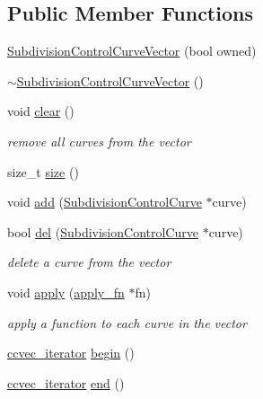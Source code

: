 \subsection*{Public Member Functions}
\begin{DoxyCompactItemize}
\item 
\hyperlink{classShipCAD_1_1SubdivisionControlCurveVector_aed33415ee5279a469d62a4433776df26}{Subdivision\-Control\-Curve\-Vector} (bool owned)
\item 
\hyperlink{classShipCAD_1_1SubdivisionControlCurveVector_adc5d990adac605cc8729f3a9115c91d2}{$\sim$\-Subdivision\-Control\-Curve\-Vector} ()
\item 
void \hyperlink{classShipCAD_1_1SubdivisionControlCurveVector_a5bfece236c23baff743107b90075fe9c}{clear} ()
\begin{DoxyCompactList}\small\item\em remove all curves from the vector \end{DoxyCompactList}\item 
size\-\_\-t \hyperlink{classShipCAD_1_1SubdivisionControlCurveVector_a20adf2059ae6fd4c6a5d08c48093a2bf}{size} ()
\item 
void \hyperlink{classShipCAD_1_1SubdivisionControlCurveVector_a23b7c48a1e02692f7b12d00084e0faf6}{add} (\hyperlink{classShipCAD_1_1SubdivisionControlCurve}{Subdivision\-Control\-Curve} $\ast$curve)
\item 
bool \hyperlink{classShipCAD_1_1SubdivisionControlCurveVector_aad00d00fd6f6202a31afbbd8842ad169}{del} (\hyperlink{classShipCAD_1_1SubdivisionControlCurve}{Subdivision\-Control\-Curve} $\ast$curve)
\begin{DoxyCompactList}\small\item\em delete a curve from the vector \end{DoxyCompactList}\item 
void \hyperlink{classShipCAD_1_1SubdivisionControlCurveVector_a699ebf520d53380752037a06fee8371d}{apply} (\hyperlink{classShipCAD_1_1SubdivisionControlCurveVector_a141aff5158a297112fec989165732299}{apply\-\_\-fn} $\ast$fn)
\begin{DoxyCompactList}\small\item\em apply a function to each curve in the vector \end{DoxyCompactList}\item 
\hyperlink{classShipCAD_1_1SubdivisionControlCurveVector_a33907b10974aed115e0217c836424762}{ccvec\-\_\-iterator} \hyperlink{classShipCAD_1_1SubdivisionControlCurveVector_abeccf7ff2c8be83040d6bf67f3217707}{begin} ()
\item 
\hyperlink{classShipCAD_1_1SubdivisionControlCurveVector_a33907b10974aed115e0217c836424762}{ccvec\-\_\-iterator} \hyperlink{classShipCAD_1_1SubdivisionControlCurveVector_a11c8b89feb662d2d76c75b44cb2a9146}{end} ()
\end{DoxyCompactItemize}


